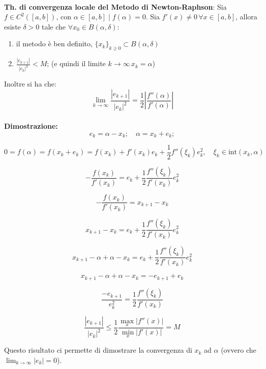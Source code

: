 \documentclass[a4paper, 11pt]{article}
\begin{document}
        \paragraph{}
        \textbf{Th. di convergenza locale del Metodo di Newton-Raphson}: Sia \( f \in C^2([a,b]) \), con \( \alpha \in [a,b] \mid f(\alpha) = 0 \).
        Sia \( f'(x) \neq 0 \, \forall x \in [a,b] \), allora esiste \( \delta > 0 \) tale che \( \forall x_0 \in B(\alpha, \delta) \):
        \begin{enumerate}
            \item il metodo è ben definito, \( \{x_k\}_{k \geq 0} \subset B(\alpha, \delta) \)
            \item \( \frac{|e_{k+1}|}{|e_k|^2} < M \); (e quindi il limite \( k \to \infty \, x_k = \alpha \))
        \end{enumerate}
        Inoltre si ha che:
        \[
        \lim_{k \to \infty} \frac{|e_{k+1}|}{|e_k|^2} = \frac{1}{2} \left| \frac{f''(\alpha)}{f'(\alpha)} \right|
        \]

        \paragraph{}
        \textbf{Dimostrazione: }
        \[
        e_k = \alpha - x_k; \quad \alpha = x_k + e_k;
        \]

        \[
        0 = f(\alpha) = f(x_k + e_k) = f(x_k) + f'(x_k) e_k + \frac{1}{2} f''(\xi_k)e_k^2, \quad \xi_k \in \text{int}(x_k,\alpha)
        \]

        \[
        -\frac{f(x_k)}{f'(x_k)} = e_k + \frac{1}{2} \frac{f''(\xi_k)}{f'(x_k)} e_k^2
        \]

        \[
        -\frac{f(x_k)}{f'(x_k)} = x_{k+1} - x_k
        \]

        \[
        x_{k+1} - x_k = e_k + \frac{1}{2} \frac{f''(\xi_k)}{f'(x_k)} e_k^2
        \]

        \[
        x_{k+1} - \alpha + \alpha - x_k = e_k + \frac{1}{2} \frac{f''(\xi_k)}{f'(x_k)} e_k^2
        \]

        \[
        x_{k+1} - \alpha + \alpha - x_k = - e_{k+1} + e_k
        \]

        \[
        \frac{-e_{k+1}}{e_k^2} = \frac{1}{2} \frac{f''(\xi_k)}{f'(x_k)}
        \]

        \[
        \frac{|e_{k+1}|}{|e_k|^2} \leq \frac{1}{2} \frac{\max_x |f''(x)|}{\min_x |f'(x)|} = M
        \]

        Questo risultato ci permette di dimostrare la convergenza di \( x_k \) ad \( \alpha \) (ovvero che \( \lim_{k \to \infty} |e_k| = 0 \)).
\end{document}
